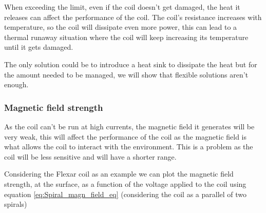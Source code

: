 When exceeding the limit, even if the coil doesn't get damaged, the heat it releases can affect the performance of the coil. The coil's resistance increases with temperature, so the coil will dissipate even more power, this can lead to a thermal runaway situation where the coil will keep increasing its temperature until it gets damaged.

The only solution could be to introduce a heat sink to dissipate the heat but for the amount needed to be managed, we will show that flexible solutions aren't enough.

\subsubsection{Magnetic field strength}
As the coil can't be run at high currents, the magnetic field it generates will be very weak, this will affect the performance of the coil as the magnetic field is what allows the coil to interact with the environment. This is a problem as the coil will be less sensitive and will have a shorter range.

Considering the Flexar coil as an example we can plot the magnetic field strength, at the surface, as a function of the voltage applied to the coil using equation \ref{eq:Spiral_magn_field_eq} (considering the coil as a parallel of two spirals)

\begin{center}
\end{center}

